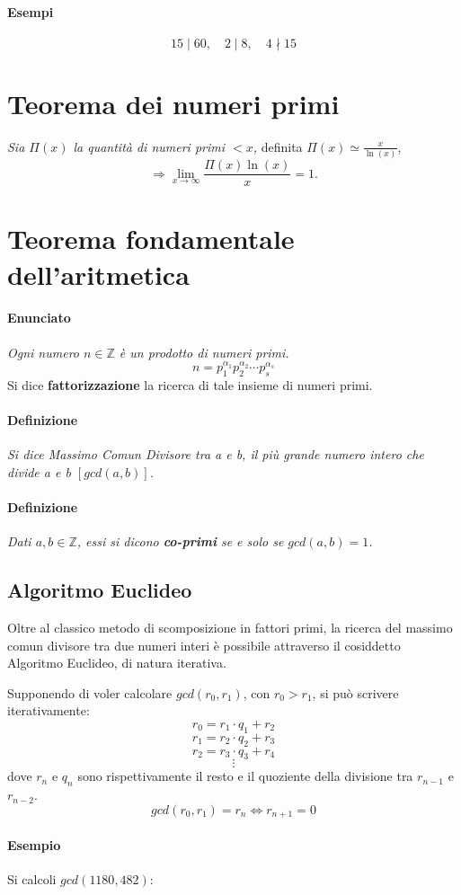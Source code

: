\documentclass[a4paper]{report}
\begin{document}
\paragraph{Esempi}
$$15\mid 60,\quad 2\mid 8,\quad 4\nmid 15$$
\section{Teorema dei numeri primi}
\textit{Sia $\Pi (x)$ la quantità di numeri primi $<x$,} definita $\Pi (x) \simeq \frac{x}{\ln{(x)}}$,
$$\Rightarrow \lim_{x\to\infty} \frac{\Pi (x)\ln{(x)}}{x}=1.$$
\section{Teorema fondamentale dell'aritmetica}
\paragraph{Enunciato} \textit{Ogni numero $n\in \mathbb{Z}$ è un prodotto di numeri primi.}
$$n=p_1^{\alpha _1}p_2^{\alpha _2}\cdots p_s^{\alpha _s}$$
Si dice \textbf{fattorizzazione} la ricerca di tale insieme di numeri primi.
\paragraph{Definizione} \textit{Si dice Massimo Comun Divisore tra a e b, il più grande numero intero che divide a e b $[gcd(a,b)]$.}
\paragraph{Definizione} \textit{Dati $a,b\in \mathbb{Z}$, essi si dicono \textbf{co-primi} se e solo se $gcd(a,b)=1$.}
\subsection{Algoritmo Euclideo} Oltre al classico metodo di scomposizione in fattori primi, la ricerca del massimo comun divisore tra due numeri interi è possibile attraverso il cosiddetto Algoritmo Euclideo, di natura iterativa.

Supponendo di voler calcolare $gcd(r_0,r_1)$, con $r_0>r_1$, si può scrivere iterativamente:
$$r_0=r_1\cdot q_1 + r_2$$
$$r_1=r_2\cdot q_2 + r_3$$
$$r_2=r_3\cdot q_3 + r_4$$
$$\vdots$$
dove $r_n$ e $q_n$ sono rispettivamente il resto e il quoziente della divisione tra $r_{n-1}$ e $r_{n-2}$.
$$gcd(r_0,r_1)=r_n \Leftrightarrow r_{n+1}=0$$
\paragraph{Esempio}
Si calcoli $gcd(1180,482)$:
\end{document}
